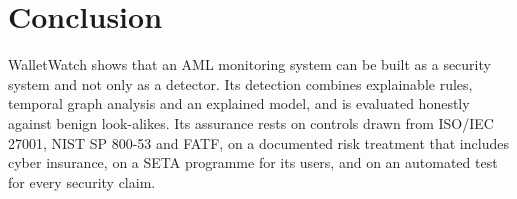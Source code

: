 \documentclass[conference,10pt]{IEEEtran}
\begin{document}
\section{Conclusion}
WalletWatch shows that an AML monitoring system can be built as a security system and not only as
a detector. Its detection combines explainable rules, temporal graph analysis and an explained
model, and is evaluated honestly against benign look-alikes. Its assurance rests on controls drawn
from ISO/IEC 27001, NIST SP 800-53 and FATF, on a documented risk treatment that includes cyber
insurance, on a SETA programme for its users, and on an automated test for every security claim.

\balance


\end{document}
